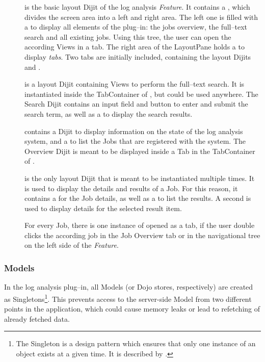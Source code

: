 \begin{description}
	\item[] is the basic layout Dijit of the log analysis \emph{Feature}. It contains a , which divides the screen area into a left and right area. The left one is filled with a  to display all elements of the plug--in: the jobs overview, the full--text search and all existing jobs. Using this tree, the user can open the according Views in a tab. The right area of the LayoutPane holds a  to display \emph{tabs}. Two tabs are initially included, containing the layout Dijits  and .
	\item[] is a layout Dijit containing Views to perform the full--text search. It is instantiated inside the TabContainer of , but could be used anywhere.
	The Search Dijit contains an input field and button to enter and submit the search term, as well as a  to display the search results.
	\item[] contains a  Dijit to display information on the state of the log analysis system, and a  to list the Jobs that are registered with the system. The Overview Dijit is meant to be displayed inside a Tab in the TabContainer of .
	\item[] is the only layout Dijit that is meant to be instantiated multiple times. It is used to display the details and results of a Job. For this reason, it contains a  for the Job details, as well as a  to list the results. A second  is used to display details for the selected result item.

	For every Job, there is one instance of  opened as a tab, if the user double clicks the according job in the Job Overview tab or in the navigational tree on the left side of the \emph{Feature}.
\end{description}

\subsubsection*{Models}
In the log analysis plug--in, all Models (or Dojo stores, respectively) are created as Singletons\footnote{The Singleton is a design pattern which ensures that only one instance of an object exists at a given time. It is described by .}. This prevents access to the server-side Model from two different points in the application, which could cause memory leaks or lead to refetching of already fetched data.

